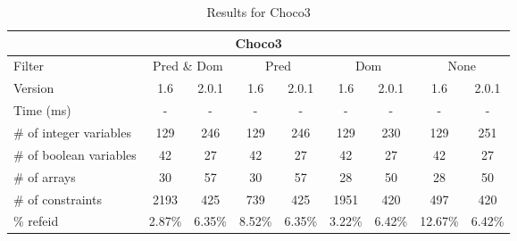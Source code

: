 \documentclass{standalone}
\begin{document}
\begin{table}[H]
\footnotesize
\begin{tabular}{lc|c|c|c|c|c|c|c}
\multicolumn{9}{c}{Choco3} \\ 
\hline\hline Filter & \multicolumn{2}{c|}{Pred \& Dom} &\multicolumn{2}{c|}{Pred}  & \multicolumn{2}{c|}{Dom} & \multicolumn{2}{c}{None} \\ 
\hline Version & 1.6 & 2.0.1 & 1.6 & 2.0.1 & 1.6 & 2.0.1 & 1.6 & 2.0.1 \\ 
Time (ms)               & - & - & - & - & - & - & - & - \\ 
\# of integer variables & 129 & 246 & 129 & 246 & 129 & 230 & 129 & 251 \\ 
\# of boolean variables & 42 & 27 & 42 & 27 & 42 & 27 & 42 & 27 \\ 
\# of arrays            & 30 & 57 & 30 & 57 & 28 & 50 & 28 & 50 \\ 
\# of constraints       & 2193 & 425 & 739 & 425 & 1951 & 420 & 497 & 420 \\ 
\% refeid               & 2.87\% & 6.35\% & 8.52\% & 6.35\% & 3.22\% & 6.42\% & 12.67\% & 6.42\% \\ 
\end{tabular}
\caption{Results for Choco3}\label{tab:res_choco}
\end{table}
\end{document}

